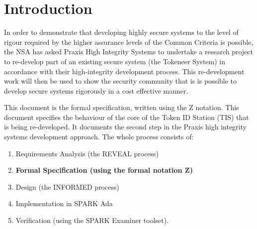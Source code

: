 \chapter{Introduction}
In order to demonstrate that developing highly secure systems to the
level of rigour required by the higher assurance levels of the Common
Criteria is possible, the NSA has asked Praxis High Integrity Systems to
undertake a research project to re-develop part of an existing secure
system (the Tokeneer System) in accordance with their high-integrity
development process. This re-development work will then be used to
show the security community that is is possible to develop secure
systems rigorously in a cost effective manner.

This document is the formal specification, written using the Z
notation. This document specifies the behaviour of the core of the Token
ID Station (TIS) that is being re-developed.
It documents the second step in the Praxis high
integrity systems development approach. The whole process consists of:

\begin{enumerate}
\item
Requirements Analysis (the REVEAL process)
\item
{\bf Formal Specification (using the formal notation Z)}
\item
Design (the INFORMED process)
\item
Implementation in SPARK Ada
\item
Verification (using the SPARK Examiner toolset).
\end{enumerate}

